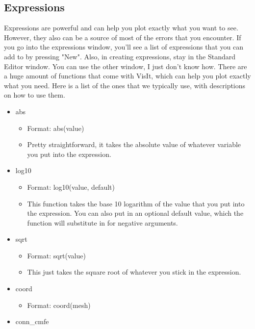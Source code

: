 \documentclass[english]{article}
\begin{document}
    \subsection{Expressions}
    Expressions are powerful and can help you plot exactly what you want to see. However, they also can be
    a source of most of the errors that you encounter. If you go into the expressions window, you'll see
    a list of expressions that you can add to by pressing "New". Also, in creating expressions, stay in the
    Standard Editor window. You can use the other window, I just don't know how. There are a huge amount of
    functions that come with VisIt, which can help you plot exactly what you need. Here is a list of the ones
    that we typically use, with descriptions on how to use them.
    \begin{itemize}
        \item abs
        \begin{itemize}
            \item Format: abs(value)
            \item Pretty straightforward, it takes the absolute value of whatever variable you put into the
                  expression.
        \end{itemize}
        \item log10
        \begin{itemize}
            \item Format: log10(value, default)
            \item This function takes the base 10 logarithm of the value that you put into the expression. You
                  can also put in an optional default value, which the function will substitute in for negative
                  arguments.
        \end{itemize}
        \item sqrt
        \begin{itemize}
            \item Format: sqrt(value)
            \item This just takes the square root of whatever you stick in the expression.
        \end{itemize}
        \item coord
        \begin{itemize}
            \item Format: coord(mesh)
        \end{itemize}
        \item conn\_cmfe
        \begin{itemize}

\end{itemize}
\end{itemize}
\end{document}
